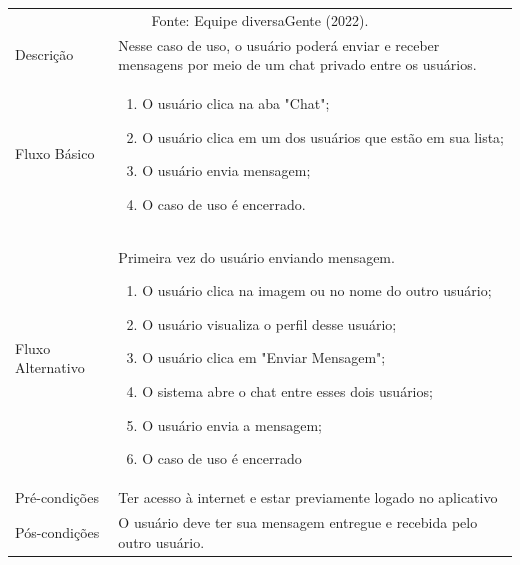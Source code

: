 \documentclass[
    12pt,               %
    openright,          %
    oneside,
    a4paper,            %
    paginasA3,  %
    BIBLATEX,           %
    REFINDENT,          %
    MODELO,             %
    TODO,               %
    english,            %
    brazil              %
    ]{ifsp-spo-inf-ctds} %
\providecommand{\DIFadd}[1]{{\protect\color{blue}\uwave{#1}}} %
\providecommand{\DIFaddbegin}{} %
\providecommand{\DIFaddend}{} %
\providecommand{\DIFdelbegin}{} %
\providecommand{\DIFdelend}{} %
\begin{document}
\begin{apendicesenv}
	\begin{quadro}[htb]
		\centering
		\ABNTEXfontereduzida
\caption[Caso de Uso Troca de mensagens de texto em chat individual]{Caso de Uso Troca de mensagens de texto em chat individual}
		\DIFaddbegin \label{casos-de-uso15}
	\DIFaddend \end{quadro}

	\begin{longtable}{|p{3.3cm}|p{12.3cm}|}
		\hline
		\thead{} & \thead{Ator} \\
		\hline
		\DIFaddbegin 

										
		\endfirsthead
		\multicolumn{2}{c}{\scriptsize Fonte: Equipe diversaGente (2022).}%
		{{ \autoref{casos-de-uso15} \DIFadd{continued from previous page}}} \\
		\endhead

		\DIFaddend Descrição &Nesse caso de uso, o usuário poderá enviar e receber mensagens por meio de um chat privado entre os usuários.\\
		\hline
		Fluxo Básico  & 
		\begin{enumerate}
			\item O usuário clica na aba "Chat";
			\item O usuário clica em um dos usuários que estão em sua lista;
			\item O usuário envia mensagem;
			\item O caso de uso é encerrado. 
		\end{enumerate}\\
		\hline
		Fluxo Alternativo & 
		Primeira vez do usuário enviando mensagem. 
		\begin{enumerate}
			\item O usuário clica na imagem ou no nome do outro usuário;
			\item O usuário visualiza o perfil desse usuário;
			\item O usuário clica em "Enviar Mensagem";
			\DIFdelbegin %

\DIFdelend \item O sistema abre o chat entre esses dois usuários;
			\item O usuário envia a mensagem;
			\item O caso de uso é encerrado 
		\end{enumerate}\\
		\hline
		Pré-condições & Ter acesso à internet e estar previamente logado no aplicativo\\
		\hline
		Pós-condições & O usuário deve ter sua mensagem entregue e recebida pelo outro usuário.\\
		\hline
	\end{longtable}
	\DIFaddbegin {}
	\DIFaddend 


\end{apendicesenv}
\end{document}
